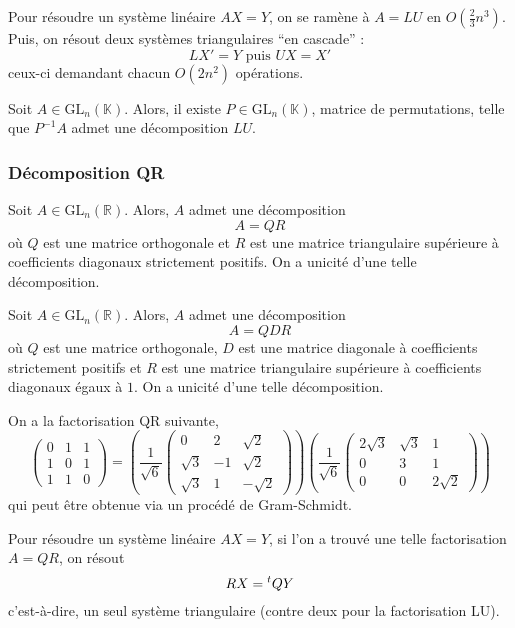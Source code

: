 	\begin{remark}
		Pour résoudre un système linéaire $AX = Y$, on se ramène à $A = LU$ en $O \left( \frac{2}{3}n^3 \right)$. Puis, on résout deux systèmes triangulaires ``en cascade'' :
		\[ LX' = Y \text{ puis } UX = X' \]
		ceux-ci demandant chacun $O(2n^2)$ opérations.
	\end{remark}
	
	\begin{theorem}
		Soit $A \in \mathrm{GL}_n(\mathbb{K})$. Alors, il existe $P \in \mathrm{GL}_n(\mathbb{K})$, matrice de permutations, telle que $P^{-1}A$ admet une décomposition $LU$.
	\end{theorem}
	
	\subsubsection{Décomposition QR}
	
	
	\begin{theorem}[Décomposition QR]
		Soit $A \in \mathrm{GL}_n(\mathbb{R})$. Alors, $A$ admet une décomposition
		\[ A = QR \]
		où $Q$ est une matrice orthogonale et $R$ est une matrice triangulaire supérieure à coefficients diagonaux strictement positifs. On a unicité d'une telle décomposition.
	\end{theorem}
	
	\begin{corollary}
		Soit $A \in \mathrm{GL}_n(\mathbb{R})$. Alors, $A$ admet une décomposition
		\[ A = QDR \]
		où $Q$ est une matrice orthogonale, $D$ est une matrice diagonale à coefficients strictement positifs et $R$ est une matrice triangulaire supérieure à coefficients diagonaux égaux à $1$. On a unicité d'une telle décomposition.
	\end{corollary}
	
	
	\begin{example}
		On a la factorisation QR suivante,
		\[ \begin{pmatrix} 0 & 1 & 1 \\ 1 & 0 & 1 \\ 1 & 1 & 0 \end{pmatrix} = \left( \frac{1}{\sqrt{6}} \begin{pmatrix} 0 & 2 & \sqrt{2} \\ \sqrt{3} & -1 & \sqrt{2} \\ \sqrt{3} & 1 & -\sqrt{2} \end{pmatrix} \right) \left( \frac{1}{\sqrt{6}} \begin{pmatrix} 2\sqrt{3} & \sqrt{3} & 1 \\ 0 & 3 & 1 \\ 0 & 0 & 2\sqrt{2} \end{pmatrix} \right) \]
		qui peut être obtenue via un procédé de Gram-Schmidt.
	\end{example}
	
	
	\begin{remark}
		Pour résoudre un système linéaire $AX = Y$, si l'on a trouvé une telle factorisation $A = QR$, on résout
		\[ RX = \mathstrut ^t QY \]
		c'est-à-dire, un seul système triangulaire (contre deux pour la factorisation LU).
	\end{remark}

